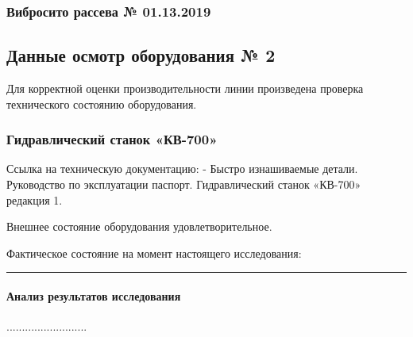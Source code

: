\subsubsection{Вибросито рассева № 01.13.2019}

\vspace{10mm}







\subsection{Данные осмотр оборудования № 2}
Для корректной оценки производительности линии 
 произведена проверка технического состоянию оборудования.
\subsubsection{Гидравлический станок «КВ-700»}

Ссылка на техническую документацию:
- Быстро изнашиваемые детали. Руководство по эксплуатации паспорт.
Гидравлический станок «КВ-700» редакция 1.

Внешнее состояние оборудования удовлетворительное.

Фактическое состояние на момент настоящего исследования:

\rule{145mm}{0.1 mm}



\paragraph{Анализ результатов исследования}




..........................

